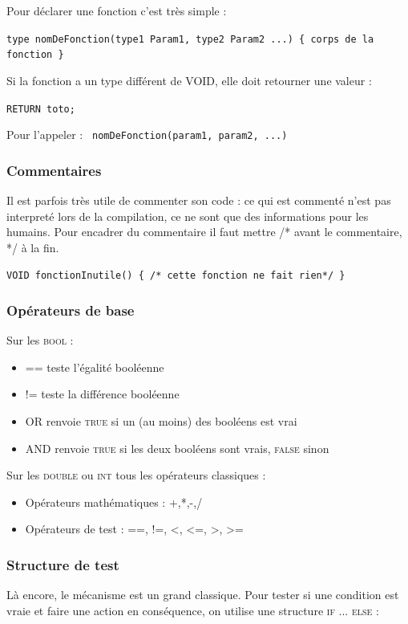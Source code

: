 \documentclass[a4paper,11pt]{article}
\begin{document}
Pour déclarer une fonction c'est très simple : 
\begin{center}
\texttt{type nomDeFonction(type1 Param1, type2 Param2 ...) \{ corps de la fonction \}}
\end{center}


Si la fonction a un type différent de VOID, elle doit retourner une valeur : 
\begin{center}
\texttt{RETURN toto;}
\end{center}

Pour l'appeler : \texttt{ nomDeFonction(param1, param2, ...)}

\subsubsection{Commentaires}
Il est parfois très utile de commenter son code : ce qui est commenté n'est pas interpreté lors de la compilation, ce ne sont que des informations pour les humains.
Pour encadrer du commentaire il faut mettre /* avant le commentaire, */ à la fin.
\begin{center}
\texttt{VOID fonctionInutile() \{ /* cette fonction ne fait rien*/ \}}
\end{center}

\subsubsection{Opérateurs de base}

Sur les \textsc{bool} : 
\begin{itemize}
	\item == teste l'égalité booléenne
	\item != teste la différence booléenne 
	\item OR renvoie \textsc{true} si un (au moins) des booléens est vrai
	\item AND renvoie \textsc{true} si les deux booléens sont vrais, \textsc{false} sinon
\end{itemize}

Sur les \textsc{double} ou \textsc{int} tous les opérateurs classiques :
\begin{itemize}
	\item Opérateurs mathématiques : +,*,-,/
	\item Opérateurs de test : ==, !=, <, <=, >, >=
\end{itemize}

\subsubsection{Structure de test}
 Là encore, le mécanisme est un grand classique. Pour tester si une condition est vraie et faire une action en conséquence, on utilise une structure \textsc{if} ... \textsc{else} :
\end{document}
